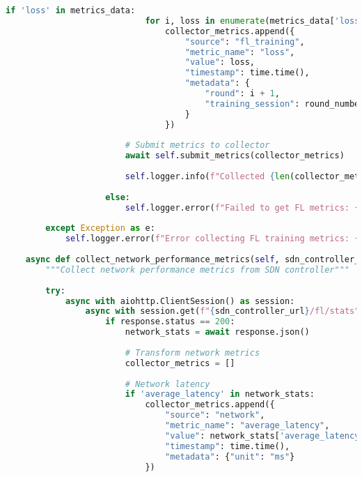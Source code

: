\begin{lstlisting}[language=python, caption=Custom Metrics Collector]
                        if 'loss' in metrics_data:
                            for i, loss in enumerate(metrics_data['loss']):
                                collector_metrics.append({
                                    "source": "fl_training",
                                    "metric_name": "loss",
                                    "value": loss,
                                    "timestamp": time.time(),
                                    "metadata": {
                                        "round": i + 1,
                                        "training_session": round_number
                                    }
                                })
                        
                        # Submit metrics to collector
                        await self.submit_metrics(collector_metrics)
                        
                        self.logger.info(f"Collected {len(collector_metrics)} FL training metrics")
                    
                    else:
                        self.logger.error(f"Failed to get FL metrics: {response.status}")
        
        except Exception as e:
            self.logger.error(f"Error collecting FL training metrics: {e}")
    
    async def collect_network_performance_metrics(self, sdn_controller_url: str):
        """Collect network performance metrics from SDN controller"""
        
        try:
            async with aiohttp.ClientSession() as session:
                async with session.get(f"{sdn_controller_url}/fl/stats") as response:
                    if response.status == 200:
                        network_stats = await response.json()
                        
                        # Transform network metrics
                        collector_metrics = []
                        
                        # Network latency
                        if 'average_latency' in network_stats:
                            collector_metrics.append({
                                "source": "network",
                                "metric_name": "average_latency",
                                "value": network_stats['average_latency'],
                                "timestamp": time.time(),
                                "metadata": {"unit": "ms"}
                            })
                        

\end{lstlisting}
